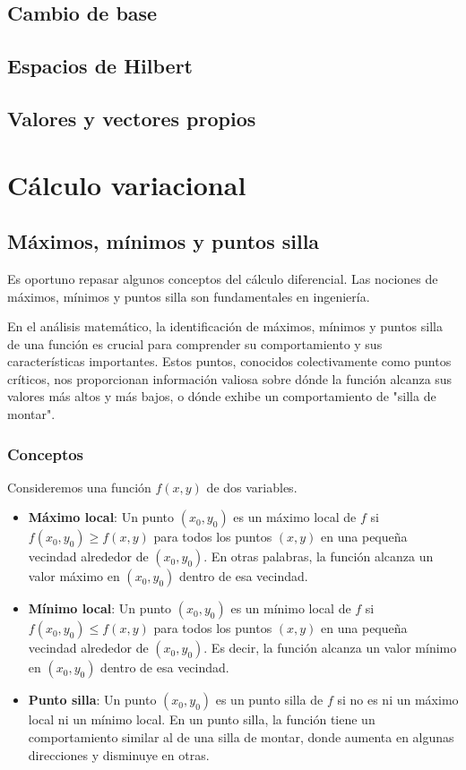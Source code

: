\subsection{Cambio de base}
\subsection{Espacios de Hilbert}
\subsection{Valores y vectores propios}

\section{Cálculo variacional}

\subsection{Máximos, mínimos y puntos silla}

Es oportuno repasar algunos conceptos del cálculo diferencial. Las nociones de máximos,
mínimos y puntos silla son fundamentales en ingeniería.

En el análisis matemático, la identificación de máximos, mínimos y puntos silla de una función es crucial para comprender su comportamiento y sus características importantes. Estos puntos, conocidos colectivamente como puntos críticos, nos proporcionan información valiosa sobre dónde la función alcanza sus valores más altos y más bajos, o dónde exhibe un comportamiento de "silla de montar".

\subsubsection{Conceptos}

Consideremos una función $f(x,y)$ de dos variables.

\begin{itemize}
	\item \textbf{Máximo local}: Un punto $(x_0, y_0)$ es un máximo local de $f$ si $f(x_0, y_0) \ge f(x, y)$ para todos los puntos $(x, y)$ en una pequeña vecindad alrededor de  $(x_0, y_0)$.  En otras palabras, la función alcanza un valor máximo en $(x_0, y_0)$ dentro de esa vecindad.
	
	\item \textbf{Mínimo local}: Un punto $(x_0, y_0)$ es un mínimo local de $f$ si $f(x_0, y_0) \le f(x, y)$ para todos los puntos $(x, y)$ en una pequeña vecindad alrededor de  $(x_0, y_0)$. Es decir, la función alcanza un valor mínimo en $(x_0, y_0)$ dentro de esa vecindad.
	
	\item \textbf{Punto silla}: Un punto $(x_0, y_0)$ es un punto silla de $f$ si no es ni un máximo local ni un mínimo local. En un punto silla, la función tiene un comportamiento similar al de una silla de montar, donde aumenta en algunas direcciones y disminuye en otras.
\end{itemize}

